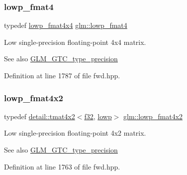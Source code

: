 \subsubsection{\texorpdfstring{lowp\+\_\+fmat4}{lowp\_fmat4}}
{\footnotesize\ttfamily typedef \hyperlink{group__gtc__type__precision_ga9ff955b170643f547661d2e7263ee426}{lowp\+\_\+fmat4x4} \hyperlink{group__gtc__type__precision_ga00dfb85ec53bb5f173747f73d13c1b8b}{glm\+::lowp\+\_\+fmat4}}

Low single-\/precision floating-\/point 4x4 matrix. \begin{DoxySeeAlso}{See also}
\hyperlink{group__gtc__type__precision}{G\+L\+M\+\_\+\+G\+T\+C\+\_\+type\+\_\+precision} 
\end{DoxySeeAlso}


Definition at line 1787 of file fwd.\+hpp.

\mbox{\label{group__gtc__type__precision_ga2433f92674e42eb6a75384fbab262306}} 
\subsubsection{\texorpdfstring{lowp\+\_\+fmat4x2}{lowp\_fmat4x2}}
{\footnotesize\ttfamily typedef \hyperlink{structglm_1_1detail_1_1tmat4x2}{detail\+::tmat4x2}$<$\hyperlink{group__gtc__type__precision_ga0ec999b57f5330d9021256e96038df04}{f32}, \hyperlink{namespaceglm_a0f04f086094c747d227af4425893f545ae161af3fc695e696ce3bf69f7332bc2d}{lowp}$>$ \hyperlink{group__gtc__type__precision_ga2433f92674e42eb6a75384fbab262306}{glm\+::lowp\+\_\+fmat4x2}}

Low single-\/precision floating-\/point 4x2 matrix. \begin{DoxySeeAlso}{See also}
\hyperlink{group__gtc__type__precision}{G\+L\+M\+\_\+\+G\+T\+C\+\_\+type\+\_\+precision} 
\end{DoxySeeAlso}


Definition at line 1763 of file fwd.\+hpp.

\mbox{\label{group__gtc__type__precision_gaa4df4f3adcc8eb3bed680b14a87fb2c4}} 
